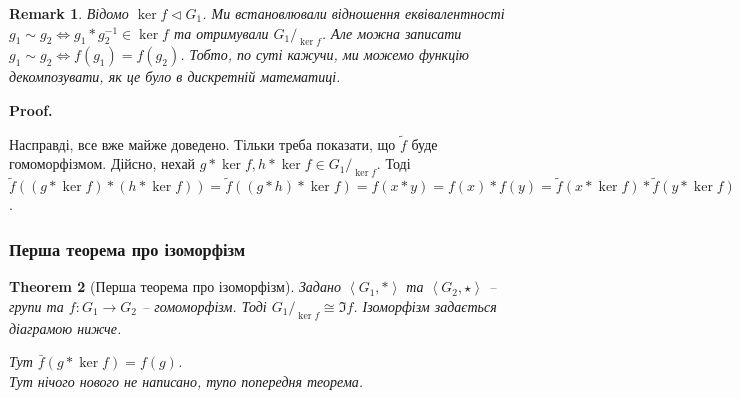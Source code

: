 \documentclass[a4paper, 10pt]{article}
\makeatletter
\theoremstyle{theoremdd}
\newtheorem{theorem}{Theorem}[subsection]
\theoremstyle{theoremdd}
\theoremstyle{theoremdd}
\theoremstyle{theoremdd}
\theoremstyle{theoremdd}
\theoremstyle{theoremdd}
\theoremstyle{theoremdd}
\theoremstyle{theoremdd}
\theoremstyle{theoremdd}
\theoremstyle{theoremdd}
\theoremstyle{theoremdd}
\newtheorem{remark}[theorem]{Remark}
\theoremstyle{theoremdd}
\theoremstyle{theoremdd}
\theoremstyle{theoremdd}
\theoremstyle{theoremdd}
\renewenvironment{proof}[1][Proof.\\]{\par
\pushQED{\hfill \qed}%
\normalfont \topsep6\p@\@plus6\p@\relax
\trivlist
\item\relax
{\bfseries
#1\@addpunct{.}}\hspace\labelsep\ignorespaces
}{%
\popQED\endtrivlist\@endpefalse
}
\makeatother
\begin{document}
\begin{remark}
Відомо $\ker f \triangleleft G_1$. Ми встановлювали відношення еквівалентності $g_1 \sim g_2 \iff g_1*g_2^{-1} \in \ker f$ та отримували $G_1/_{\ker f}$. Але можна записати $g_1 \sim g_2 \iff f(g_1) = f(g_2)$. Тобто, по суті кажучи, ми можемо функцію декомпозувати, як це було в дискретній математиці.
\end{remark}

\begin{proof}
Насправді, все вже майже доведено. Тільки треба показати, що $\tilde{f}$ буде гомоморфізмом. Дійсно, нехай $g*\ker f, h*\ker f \in G_1/_{\ker f}$. Тоді\\
$\tilde{f}((g*\ker f)*(h*\ker f)) = \tilde{f}((g*h)*\ker f) = f(x*y) = f(x)*f(y) = \tilde{f}(x*\ker f)* \tilde{f}(y*\ker f)$.
\end{proof}

\subsubsection{Перша теорема про ізоморфізм}
\begin{theorem}[Перша теорема про ізоморфізм]
Задано $\left<G_1, * \right>$ та $\left<G_2, \star \right>$ -- групи та $f \colon G_1 \to G_2$ -- гомоморфізм. Тоді ${G_1}/_{\ker f} \cong \Im f$. Ізоморфізм задається діаграмою нижче.
\begin{figure}[H]
\centering
{}
\end{figure}
Тут $\bar{f}(g*\ker f) = f(g)$.\\
\textit{Тут нічого нового не написано, тупо попередня теорема.}
\end{theorem}
\end{document}
